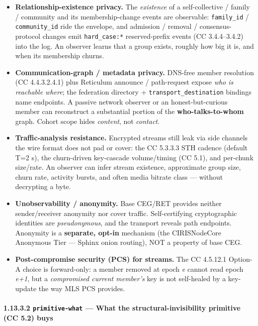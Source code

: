 \documentclass[11pt]{article}
\begin{document}
\begin{itemize}\setlength\itemsep{0pt}
\item \textbf{Relationship-existence privacy.} The \textit{existence} of a self-collective / family / community and its membership-change events are observable: \texttt{family\_id} / \texttt{community\_id} ride the envelope, and admission / removal / consensus-protocol changes emit \texttt{hard\_case:*} reserved-prefix events (CC 3.4.4–3.4.2) into the log. An observer learns that a group exists, roughly how big it is, and when its membership churns.
\item \textbf{Communication-graph / metadata privacy.} DNS-free member resolution (CC 4.4.3.2.4.1) plus Reticulum announce / path-request expose \textit{who is reachable where}; the federation directory + \texttt{transport\_destination} bindings name endpoints. A passive network observer or an honest-but-curious member can reconstruct a substantial portion of the \textbf{who-talks-to-whom} graph. Cohort scope hides \textit{content}, not \textit{contact}.
\item \textbf{Traffic-analysis resistance.} Encrypted streams still leak via side channels the wire format does not pad or cover: the CC 5.3.3.3 STH cadence (default T=2 s), the churn-driven key-cascade volume/timing (CC 5.1), and per-chunk size/rate. An observer can infer stream existence, approximate group size, churn rate, activity bursts, and often media bitrate class — without decrypting a byte.
\item \textbf{Unobservability / anonymity.} Base CEG/RET provides neither sender/receiver anonymity nor cover traffic. Self-certifying cryptographic identities are \textit{pseudonymous}, and the transport reveals path endpoints. Anonymity is a \textbf{separate, opt-in} mechanism (the CIRISNodeCore Anonymous Tier — Sphinx onion routing), NOT a property of base CEG.
\item \textbf{Post-compromise security (PCS) for streams.} The CC 4.5.12.1 Option-A choice is forward-only: a member removed at epoch \textit{e} cannot read epoch \textit{e+1}, but a \textit{compromised current member's} key is not self-healed by a key-update the way MLS PCS provides.
\end{itemize}


\paragraph{1.13.3.2 \texttt{primitive-what} — What the structural-invisibility primitive (CC 5.2) buys}\mbox{}\\
\end{document}
